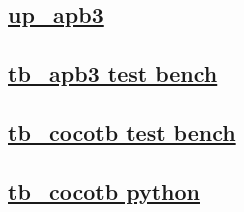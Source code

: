 \documentclass{article}
\begin{document}
  


  \subsection{\href{../files/up_apb3-v.html}{up\_apb3}}
  \subsection{\href{../files2/tb_apb3-v.html}{tb\_apb3 test bench}}
  \subsection{\href{../files2/tb_cocotb-v.html}{tb\_cocotb test bench}}
  \subsection{\href{../files2/tb_cocotb-py.html}{tb\_cocotb python}}
\end{document}
